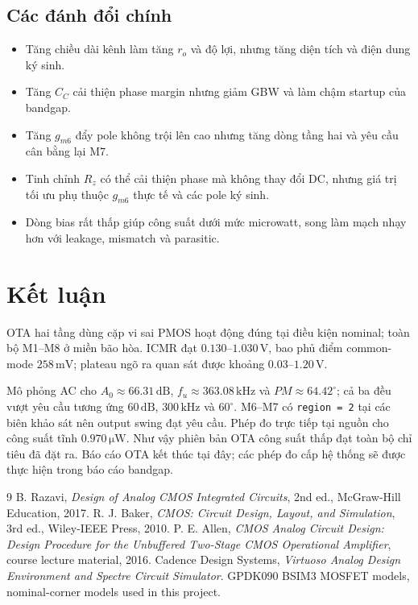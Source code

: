 \documentclass[11pt,a4paper]{report}
\newcommand{\micro}{\mu}
\newcommand{\SI}[2]{\ensuremath{#1\,\mathrm{#2}}}
\newcommand{\SIrange}[3]{\ensuremath{#1\text{--}#2\,\mathrm{#3}}}
\newcommand{\ang}[1]{\ensuremath{#1^{\circ}}}
\begin{document}
\section{Các đánh đổi chính}
\begin{itemize}[leftmargin=18mm]
  \item Tăng chiều dài kênh làm tăng $r_o$ và độ lợi, nhưng tăng diện tích và điện dung ký sinh.
  \item Tăng $C_C$ cải thiện phase margin nhưng giảm GBW và làm chậm startup của bandgap.
  \item Tăng $g_{m6}$ đẩy pole không trội lên cao nhưng tăng dòng tầng hai và yêu cầu cân bằng lại M7.
  \item Tinh chỉnh $R_z$ có thể cải thiện phase mà không thay đổi DC, nhưng giá trị tối ưu phụ thuộc $g_{m6}$ thực tế và các pole ký sinh.
  \item Dòng bias rất thấp giúp công suất dưới mức microwatt, song làm mạch nhạy hơn với leakage, mismatch và parasitic.
\end{itemize}

\chapter{Kết luận}
OTA hai tầng dùng cặp vi sai PMOS hoạt động đúng tại điều kiện nominal; toàn bộ M1--M8 ở miền bão hòa. ICMR đạt \SIrange{0.130}{1.030}{V}, bao phủ điểm common-mode \SI{258}{mV}; plateau ngõ ra quan sát được khoảng \SIrange{0.03}{1.20}{V}.

Mô phỏng AC cho $A_0\approx\SI{66.31}{dB}$, $f_u\approx\SI{363.08}{kHz}$ và $PM\approx\ang{64.42}$; cả ba đều vượt yêu cầu tương ứng \SI{60}{dB}, \SI{300}{kHz} và \ang{60}. M6--M7 có \texttt{region = 2} tại các biên khảo sát nên output swing đạt yêu cầu. Phép đo trực tiếp tại nguồn cho công suất tĩnh \SI{0.970}{\micro W}. Như vậy phiên bản OTA công suất thấp đạt toàn bộ chỉ tiêu đã đặt ra. Báo cáo OTA kết thúc tại đây; các phép đo cấp hệ thống sẽ được thực hiện trong báo cáo bandgap.

\begin{thebibliography}{9}
 B. Razavi, \emph{Design of Analog CMOS Integrated Circuits}, 2nd ed., McGraw-Hill Education, 2017.
 R. J. Baker, \emph{CMOS: Circuit Design, Layout, and Simulation}, 3rd ed., Wiley-IEEE Press, 2010.
 P. E. Allen, \emph{CMOS Analog Circuit Design: Design Procedure for the Unbuffered Two-Stage CMOS Operational Amplifier}, course lecture material, 2016.
 Cadence Design Systems, \emph{Virtuoso Analog Design Environment and Spectre Circuit Simulator}.
 GPDK090 BSIM3 MOSFET models, nominal-corner models used in this project.
\end{thebibliography}
\end{document}
